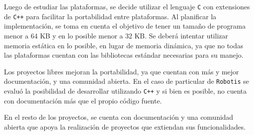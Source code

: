 
  Luego de estudiar las plataformas, se decide utilizar
el lenguaje \texttt{C} con extensiones de \texttt{C++} para facilitar
la portabilidad entre plataformas.
  Al planificar la implementación, se toma en cuenta el objetivo de
tener un tamaño de programa menor a 64 KB y en lo posible menor a 32 KB.
  Se deberá intentar utilizar memoria estática en lo posible, en lugar
de memoria dinámica, ya que no todas las plataformas cuentan con las
bibliotecas estándar necesarias para su manejo.

  Los proyectos libres mejoran la portabilidad, ya que cuentan con
más y mejor documentación, y una comunidad abierta.
  En el caso de particular de \texttt{Robotis} se evaluó la
posibilidad de desarrollar utilizando
\texttt{C++} y si bien es posible, no cuenta con documentación más
que el propio código fuente.

  En el resto de los proyectos, se cuenta con documentación y una
comunidad abierta que apoya la realización de proyectos que extiendan
sus funcionalidades.
